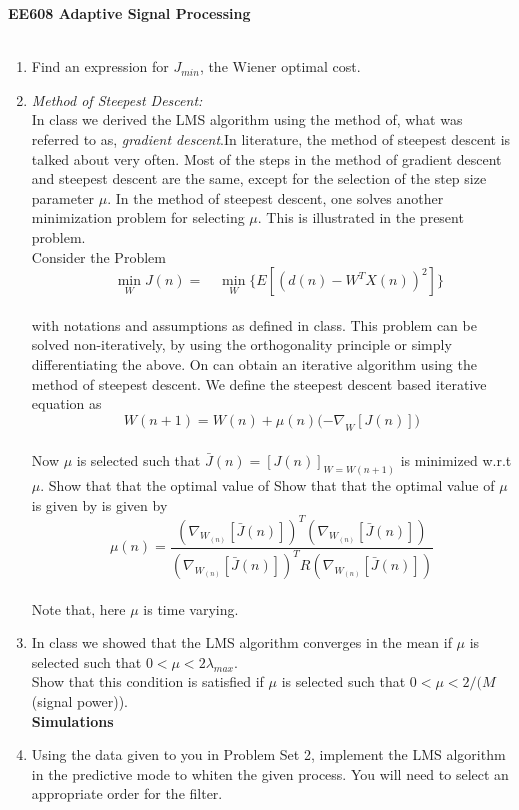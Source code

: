 \documentclass[journal,12pt,onecolumn]{IEEEtran}
\begin{document}
\centering \textbf{EE608  Adaptive Signal Processing}\\
\medskip
{}\\
\bigskip
\begin{enumerate}
\item Find an expression for $J_{min}$, the Wiener optimal cost.\\
\medskip
\item \textit{Method of Steepest Descent:}\\
\smallskip
In class we derived the LMS algorithm using the method of, what was referred to as, \textit{gradient descent}.In literature, the method of steepest descent is talked about very often. Most of the steps in the method of gradient descent and steepest descent are the same, except for the selection of the step size parameter $\mu $. In the method of steepest descent, one solves another minimization problem for selecting $ \mu.$ This is illustrated in the present problem.\\
\smallskip
Consider the Problem\\
$$\quad\min_W{J(n)}=\quad\min_W\{E[(d(n)-W^TX(n))^2]\}$$\\
\medskip
with notations and assumptions as defined in class. This problem can be solved non-iteratively, by using the orthogonality principle or simply differentiating the above. On can obtain an iterative algorithm using the method of steepest descent. We define the steepest descent based iterative equation as\\
$$W(n+1)=W(n)+\mu(n){(-\nabla}_W[J(n)])$$\\
\medskip
Now $\mu$ is selected such that $\bar{J}(n)=[J(n)]_{W=W(n+1 )}$ is minimized w.r.t $\mu.$ Show that that the optimal value of Show that that the optimal value of $\mu$ is given by is given by
$$\mu(n)=\frac{(\nabla_{W_{(n)}}[\bar{J}(n)])^T(\nabla_{W_{(n)}}[\bar{J}(n)])}{(\nabla_{W_{(n)}}[\bar{J}(n)])^TR(\nabla_{W_{(n)}}[\bar{J}{(n)}])} $$\\
\medskip
Note that, here $\mu $ is time varying.
\medskip
\item In class we showed that the LMS algorithm converges in the mean if $\mu $ is selected such that $0<\mu <2{\lambda}_{max}.$ \\
Show that this condition is satisfied if $\mu$ is selected such that $0 < \mu < 2/(M$ (signal power)).\\
\bigskip 	
\textbf{Simulations}
\medskip
\item Using the data given to you in Problem Set 2, implement the LMS algorithm in the predictive mode to whiten the given process. You will need to select an appropriate order for the filter.\\

\end{enumerate}
\end{document}

